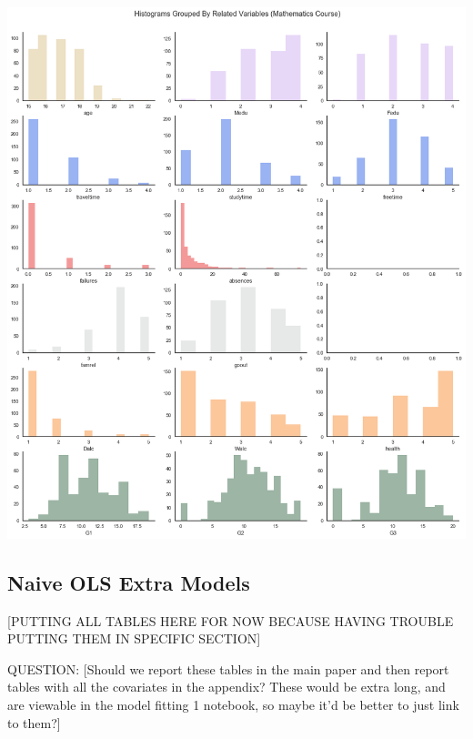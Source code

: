 \documentclass[12pt]{article}
\begin{document}
\includegraphics[scale=0.5]{figures/quantvar_hist_math.png}


\subsection{Naive OLS Extra Models}

\textcolor{BrickRed}{[PUTTING ALL TABLES HERE FOR NOW BECAUSE HAVING TROUBLE PUTTING THEM IN SPECIFIC SECTION]}

QUESTION: \textcolor{BrickRed}{[Should we report these tables in the main paper and then report tables with all the covariates in the appendix? These would be extra long, and are viewable in the model fitting 1 notebook, so maybe it'd be better to just link to them?]}
\end{document}
